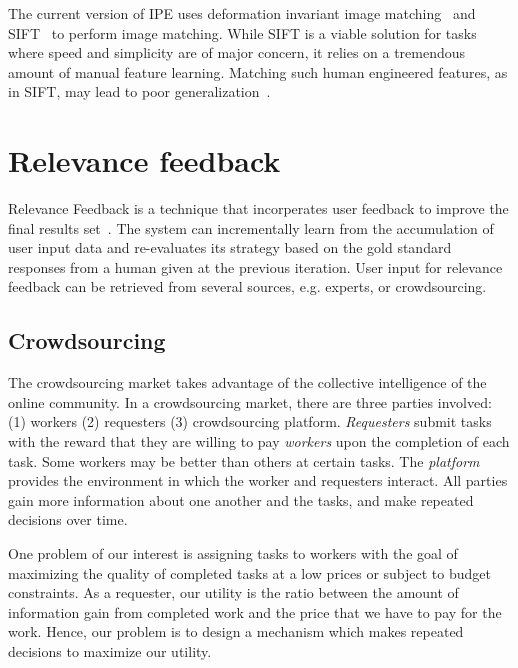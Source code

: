 The current version of IPE uses deformation invariant image
matching~\cite{yang09} and SIFT~\cite{lowe04} to perform image matching. While
SIFT is a viable solution for tasks where speed and simplicity are of major
concern, it relies on a tremendous amount of manual feature learning. Matching
such human engineered features, as in SIFT, may lead to poor
generalization~\cite{fisher14}.


\section{Relevance feedback} %
\label{sec:relevance_feedback}

Relevance Feedback is a technique that incorperates user feedback to improve the
final results set~\cite{manning2008introduction}. The system can incrementally
learn from the accumulation of user input data and re-evaluates its strategy
based on the gold standard responses from a human given at the previous
iteration.  User input for relevance feedback can be retrieved from several
sources, e.g. experts, or crowdsourcing.

\subsection{Crowdsourcing}

The crowdsourcing market takes advantage of the collective intelligence of the
online community. In a crowdsourcing market, there are three parties involved:
(1) workers (2) requesters (3) crowdsourcing platform.  \emph{Requesters} submit
tasks with the reward that they are willing to pay \emph{workers} upon the
completion of each task. Some workers may be better than others at certain
tasks. The \emph{platform} provides the environment in which the worker and
requesters interact. All parties gain more information about one another and the
tasks, and make repeated decisions over time.

One problem of our interest is assigning tasks to workers with the goal of
maximizing the quality of completed tasks at a low prices or subject to budget
constraints. As a requester, our utility is the ratio between the amount of
information gain from completed work and the price that we have to pay for the
work. Hence, our problem is to design a mechanism which makes repeated decisions
to maximize our utility.


